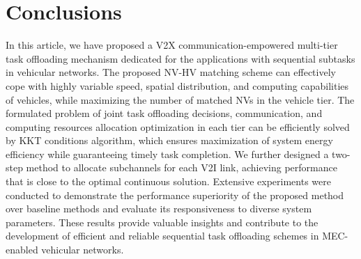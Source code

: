 \documentclass[lettersize,journal]{IEEEtran}
\begin{document}

\section{Conclusions}

In this article, we have proposed a V2X communication-empowered multi-tier task offloading mechanism dedicated for the applications with sequential subtasks in vehicular networks. The proposed NV-HV matching scheme can effectively cope with highly variable speed, spatial distribution, and computing capabilities of vehicles, while maximizing the number of matched NVs in the vehicle tier. The formulated problem of joint task offloading decisions, communication, and computing resources allocation optimization in each tier can be efficiently solved by KKT conditions algorithm, which ensures maximization of system energy efficiency while guaranteeing timely task completion. We further designed a two-step method to allocate subchannels for each V2I link, achieving performance that is close to the optimal continuous solution. Extensive experiments were conducted to demonstrate the performance superiority of the proposed method over baseline methods and evaluate its responsiveness to diverse system parameters. These results provide valuable insights and contribute to the development of efficient and reliable sequential task offloading schemes in MEC-enabled vehicular networks.
\end{document}
